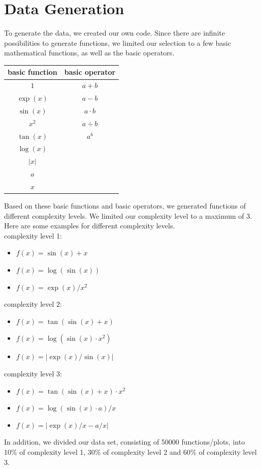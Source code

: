 \documentclass[11pt,a4paper]{scrartcl}
\begin{document}
\section{Data Generation}
To generate the data, we created our own code. Since there are infinite possibilities to generate functions, we limited our selection to a few basic mathematical functions, as well as the basic operators.\\
\begin{center}
	\begin{tabular}{c|c}
  		\textbf{basic function} & \textbf{basic operator}\\
  		\hline
  		\( 1 \) & \(a+b \) \\
  		\( \exp(x) \) & \(a-b \) \\
  		\( \sin(x) \) & \(a \cdot b \) \\
  		\( x^2 \) & \(a \div b \) \\
  		\( \tan(x) \) & \( a^b \) \\
  		\( \log(x) \) \\
  		\( |x| \) \\
  		\( a \)\\
  		\( x \) \\
	\end{tabular}
\end{center}
\vspace*{0.5cm}
Based on these basic functions and basic operators, we generated functions of different complexity levels. We limited our complexity level to a maximum of 3. \\
Here are some examples for different complexity levels. \\
complexity level 1:
\begin{itemize}
 \item \(f(x) = \sin(x)+x\)  
 \item \(f(x) = \log(\sin(x))\) 
 \item \(f(x) = \exp(x)/x^2\)
\end{itemize}
complexity level 2:
\begin{itemize}
 \item \(f(x) = \tan(\sin(x)+x)\)  
 \item \(f(x) = \log(\sin(x) \cdot x^2)\) 
 \item \(f(x) = |\exp(x)/\sin(x)|\)
\end{itemize}
complexity level 3:
\begin{itemize}
 \item \(f(x) = \tan(\sin(x)+x) \cdot x^2\)  
 \item \(f(x) = \log(\sin(x) \cdot a) / x\) 
 \item \(f(x) = |\exp(x)/x-a/x|\)
\end{itemize}
In addition, we divided our data set, consisting of 50000 functions/plots, into 10\% of complexity level 1, 30\% of complexity level 2 and 60\% of complexity level 3.
\end{document}
